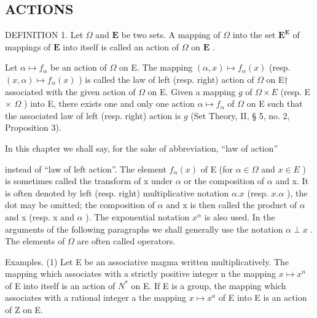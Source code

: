 \subsection{ACTIONS}

DEFINITION 1. Let \(\Omega\) and \(\mathbf{E}\) be two sets. A mapping of \(\Omega\) into the set \(\mathbf{E}^{\mathbf{E}}\) of mappings of \(\mathbf{E}\) into itself is called an action of \(\Omega\) on \(\mathbf{E}\) .

Let \(\alpha \mapsto f_{\alpha}\) be an action of \(\Omega\) on E. The mapping \((\alpha, x) \mapsto f_{\alpha}(x)\) (resp. \((x, \alpha) \mapsto f_{\alpha}(x)\) ) is called the law of left (resp. right) action of \(\Omega\) on E† associated with the given action of \(\Omega\) on E. Given a mapping \(g\) of \(\Omega \times E\) (resp. E × \(\Omega\) ) into E, there exists one and only one action \(\alpha \mapsto f_{\alpha}\) of \(\Omega\) on E such that the associated law of left (resp. right) action is \(g\) (Set Theory, II, § 5, no. 2, Proposition 3).

In this chapter we shall say, for the sake of abbreviation, ``law of action''

instead of ``law of left action''. The element \(f_{\alpha}(x)\) of E (for \(\alpha \in \Omega\) and \(x \in E\) ) is sometimes called the transform of x under \(\alpha\) or the composition of \(\alpha\) and x. It is often denoted by left (resp. right) multiplicative notation \(\alpha.x\) (resp. \(x.\alpha\) ), the dot may be omitted; the composition of \(\alpha\) and x is then called the product of \(\alpha\) and x (resp. x and \(\alpha\) ). The exponential notation \(x^{\alpha}\) is also used. In the arguments of the following paragraphs we shall generally use the notation \(\alpha \perp x\) . The elements of \(\Omega\) are often called operators.

Examples. (1) Let E be an associative magma written multiplicatively. The mapping which associates with a strictly positive integer n the mapping \(x \mapsto x^{n}\) of E into itself is an action of \(N^{*}\) on E. If E is a group, the mapping which associates with a rational integer a the mapping \(x \mapsto x^{a}\) of E into E is an action of Z on E.

